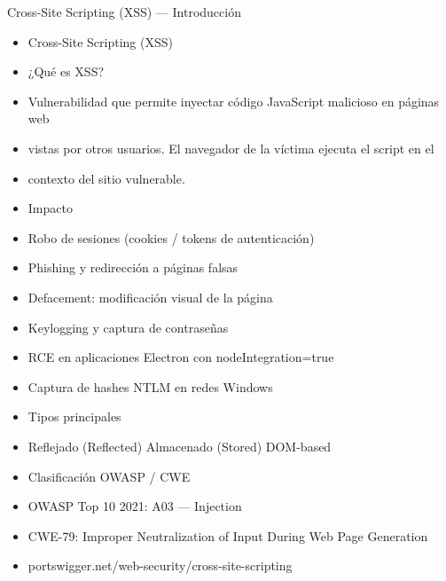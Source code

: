 \documentclass[aspectratio=169,10pt]{beamer}
\begin{document}
\begin{frame}[allowframebreaks]{Cross-Site Scripting (XSS) --- Introducción}
\small
  \begin{itemize}
  \item Cross-Site Scripting (XSS)
  \item ¿Qué es XSS?
  \item Vulnerabilidad que permite inyectar código JavaScript malicioso en páginas web
  \item vistas por otros usuarios. El navegador de la víctima ejecuta el script en el
  \item contexto del sitio vulnerable.
  \item Impacto
  \item Robo de sesiones (cookies / tokens de autenticación)
  \item Phishing y redirección a páginas falsas
  \item Defacement: modificación visual de la página
  \item Keylogging y captura de contraseñas
  \item RCE en aplicaciones Electron con nodeIntegration=true
  \item Captura de hashes NTLM en redes Windows
  \item Tipos principales
  \item Reflejado (Reflected) Almacenado (Stored) DOM-based
  \item Clasificación OWASP / CWE
  \item OWASP Top 10 2021: A03 --- Injection
  \item CWE-79: Improper Neutralization of Input During Web Page Generation
  \item portswigger.net/web-security/cross-site-scripting
  \end{itemize}
\end{frame}
\end{document}
